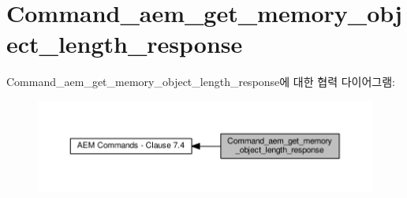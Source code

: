 \hypertarget{group__command__aem__get__memory__object__length__response}{}\section{Command\+\_\+aem\+\_\+get\+\_\+memory\+\_\+object\+\_\+length\+\_\+response}
\label{group__command__aem__get__memory__object__length__response}
Command\+\_\+aem\+\_\+get\+\_\+memory\+\_\+object\+\_\+length\+\_\+response에 대한 협력 다이어그램\+:
\nopagebreak
\begin{figure}[H]
\begin{center}
\leavevmode
\includegraphics[width=350pt]{group__command__aem__get__memory__object__length__response}
\end{center}
\end{figure}
